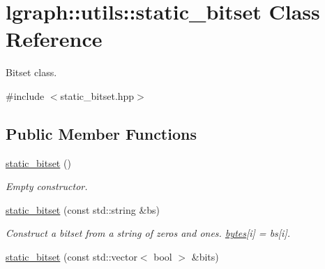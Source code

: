 \hypertarget{classlgraph_1_1utils_1_1static__bitset}{\section{lgraph\-:\-:utils\-:\-:static\-\_\-bitset Class Reference}
\label{classlgraph_1_1utils_1_1static__bitset}
}


Bitset class.  




{\ttfamily \#include $<$static\-\_\-bitset.\-hpp$>$}

\subsection*{Public Member Functions}
\begin{DoxyCompactItemize}
\item 
\hypertarget{classlgraph_1_1utils_1_1static__bitset_a6bd7edf22c70684b97eed197bb8fcda5}{\hyperlink{classlgraph_1_1utils_1_1static__bitset_a6bd7edf22c70684b97eed197bb8fcda5}{static\-\_\-bitset} ()}\label{classlgraph_1_1utils_1_1static__bitset_a6bd7edf22c70684b97eed197bb8fcda5}

\begin{DoxyCompactList}\small\item\em Empty constructor. \end{DoxyCompactList}\item 
\hypertarget{classlgraph_1_1utils_1_1static__bitset_ad8aaa938472eb7fcdc3ac1b3270600f6}{\hyperlink{classlgraph_1_1utils_1_1static__bitset_ad8aaa938472eb7fcdc3ac1b3270600f6}{static\-\_\-bitset} (const std\-::string \&bs)}\label{classlgraph_1_1utils_1_1static__bitset_ad8aaa938472eb7fcdc3ac1b3270600f6}

\begin{DoxyCompactList}\small\item\em Construct a bitset from a string of zeros and ones. \hyperlink{classlgraph_1_1utils_1_1static__bitset_a56d277fc22bbf71a27fca530a133c9bd}{bytes}\mbox{[}i\mbox{]} = {\itshape bs}\mbox{[}i\mbox{]}. \end{DoxyCompactList}\item 
\hypertarget{classlgraph_1_1utils_1_1static__bitset_a98921bd3c2ef416c5270045c63eb84a1}{\hyperlink{classlgraph_1_1utils_1_1static__bitset_a98921bd3c2ef416c5270045c63eb84a1}{static\-\_\-bitset} (const std\-::vector$<$ bool $>$ \&bits)}\label{classlgraph_1_1utils_1_1static__bitset_a98921bd3c2ef416c5270045c63eb84a1}


\end{DoxyCompactItemize}
